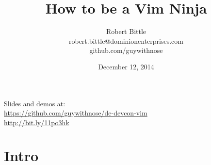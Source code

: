 \documentclass{beamer}
\title[How to be a Vim Ninja]{How to be a Vim Ninja}
\author{\hspace{12pt}Robert Bittle\hspace{12pt}\\\hspace{12pt}robert.bittle@dominionenterprises.com\hspace{12pt}\\\hspace{12pt}github.com/guywithnose\hspace{12pt}}
\date{December 12, 2014}
\begin{document}
    \begin{frame}
        \titlepage
        Slides and demos at:\\
        \href{https://github.com/guywithnose/de-devcon-vim}{https://github.com/guywithnose/de-devcon-vim}\\
        \href{http://bit.ly/11po3hk}{http://bit.ly/11po3hk}
    \end{frame}

    \section{Intro}

\end{document}
